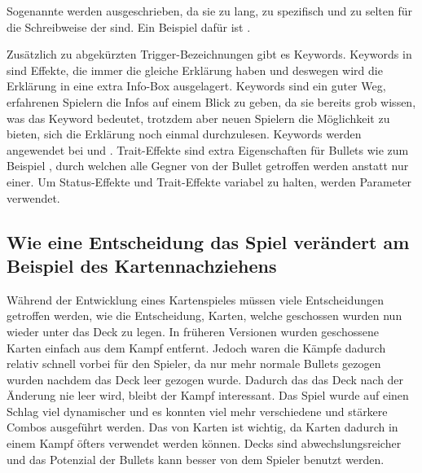Sogenannte  werden ausgeschrieben, da sie zu lang, zu spezifisch und zu selten für die Schreibweise der  sind. Ein Beispiel dafür ist
.


Zusätzlich zu abgekürzten Trigger-Bezeichnungen gibt es Keywords. Keywords in \FF sind Effekte, die immer die gleiche
Erklärung haben und deswegen wird die Erklärung in eine extra Info-Box ausgelagert.
Keywords sind ein guter Weg, erfahrenen Spielern die Infos auf einem Blick zu geben, da sie bereits grob wissen, was das
Keyword bedeutet, trotzdem aber neuen Spielern die Möglichkeit zu bieten, sich die Erklärung noch einmal durchzulesen.
Keywords werden angewendet bei  und . Trait-Effekte sind extra Eigenschaften für Bullets
wie zum Beispiel , durch welchen alle Gegner von der Bullet getroffen werden anstatt nur einer.
Um Status-Effekte und Trait-Effekte variabel zu halten, werden Parameter verwendet. %








%


\subsection{Wie eine Entscheidung das Spiel verändert am Beispiel des Kartennachziehens}\label{subsec:placementMatters}

Während der Entwicklung eines Kartenspieles müssen viele Entscheidungen getroffen werden, wie \zB die Entscheidung,
Karten, welche geschossen wurden nun wieder unter das Deck zu legen. In früheren \FF Versionen wurden geschossene Karten einfach aus dem Kampf entfernt.
Jedoch waren die Kämpfe dadurch relativ schnell vorbei für den Spieler, da nur mehr normale Bullets gezogen wurden nachdem das Deck leer gezogen wurde.
Dadurch das das Deck nach der Änderung nie leer wird, bleibt der Kampf interessant.
Das Spiel wurde auf einen Schlag viel dynamischer und es konnten viel mehr verschiedene und stärkere Combos ausgeführt werden. Das 
von Karten ist wichtig, da Karten dadurch in einem Kampf öfters verwendet werden können. Decks sind abwechslungsreicher und das Potenzial der Bullets
kann besser von dem Spieler benutzt werden.


